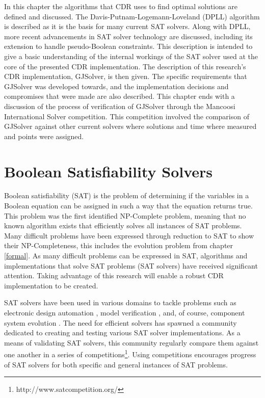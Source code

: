 In this chapter the algorithms that CDR uses to find optimal solutions are defined and discussed.  
The Davis-Putnam-Logemann-Loveland (DPLL) algorithm \citep{Davis1960, davis1962machine} is described as it is the basis for many current SAT solvers.
Along with DPLL, more recent advancements in SAT solver technology are discussed, including its extension to handle pseudo-Boolean constraints.
This description is intended to give a basic understanding of the internal workings of the SAT solver used at the core of the presented CDR implementation.
The description of this research's CDR implementation, GJSolver, is then given.
The specific requirements that GJSolver was developed towards, and the implementation decisions and compromises that were made are also described.
This chapter ends with a discussion of the process of verification of GJSolver through the Mancoosi International Solver competition.  
This competition involved the comparison of GJSolver against other current solvers where solutions and time where measured and points were assigned.

\section{Boolean Satisfiability Solvers}
\label{impl.SAT}
Boolean satisfiability (SAT) is the problem of determining if the variables in a Boolean equation can be assigned in such a way that the equation returns true.
This problem was the first identified NP-Complete problem, meaning that no known algorithm exists that efficiently solves all instances of SAT problems.
Many difficult problems have been expressed through reduction to SAT to show their NP-Completeness, this includes the evolution problem from chapter \ref{formal}.
As many difficult problems can be expressed in SAT, 
algorithms and implementations that solve SAT problems (SAT solvers) have received significant attention.
Taking advantage of this research will enable a robust CDR implementation to be created.

SAT solvers have been used in various domains to tackle problems such as electronic design automation \citep{Marques-Silva2000}, 
model verification \citep{dennis2006}, and, of course, component system evolution \citep{leBerre2010}.
The need for efficient solvers has spawned a community dedicated to creating and testing various SAT solver implementations.
As a means of validating SAT solvers, this community regularly compare them against one another in a series of competitions\footnote{http://www.satcompetition.org/}.
Using competitions encourages progress of SAT solvers for both specific and general instances of SAT problems.

